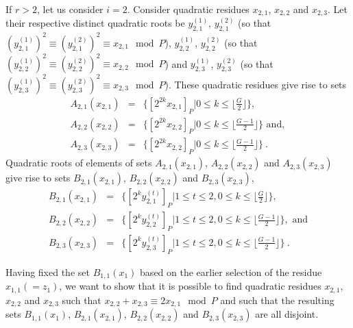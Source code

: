 \documentclass[12pt]{article} \pagestyle{plain} \topmargin
\begin{document}
If $r>2$, let us consider $i=2$. Consider quadratic residues
$x_{2,1}$, $x_{2,2}$ and $x_{2,3}$. Let  their respective distinct
quadratic roots be $y_{2,1}^{(1)}$, $y_{2,1}^{(2)}$ (so that
$(y_{2,1}^{(1)})^2 \equiv (y_{2,1}^{(2)})^2 \equiv x_{2,1} \mod P$),
$y_{2,2}^{(1)}$, $y_{2,2}^{(2)}$ (so that $(y_{2,2}^{(1)})^2 \equiv
(y_{2,2}^{(2)})^2 \equiv x_{2,2} \mod P$) and $y_{2,3}^{(1)}$,
$y_{2,3}^{(2)}$ (so that $(y_{2,3}^{(1)})^2 \equiv (y_{2,3}^{(2)})^2
\equiv x_{2,3} \mod P$). These quadratic residues give rise to sets
\begin{eqnarray}
A_{2,1}(x_{2,1})&=&\{ [2^{2k}x_{2,1}]_P | 0 \leq k \leq \lfloor
\frac{G}{2} \rfloor\},\\ A_{2,2}(x_{2,2})&=& \{ [2^{2k}x_{2,2}]_P
| 0
\leq k \leq \lfloor \frac{G-1}{2} \rfloor\} \text{ and},\\
A_{2,3}(x_{2,3})&=& \{ [2^{2k}x_{2,2}]_P | 0 \leq k \leq \lfloor
\frac{G-1}{2} \rfloor\}~.
\end{eqnarray}
Quadratic roots of elements of sets $A_{2,1}(x_{2,1})$,
$A_{2,2}(x_{2,2})$ and $A_{2,3}(x_{2,3})$ give rise to sets
$B_{2,1}(x_{2,1})$, $B_{2,2}(x_{2,2})$ and $B_{2,3}(x_{2,3})$,
\begin{eqnarray}
B_{2,1}(x_{2,1})&=&\{[2^ky_{2,1}^{(t)}]_P | 1 \leq t \leq 2, 0
\leq k
\leq \lfloor \frac{G}{2}\rfloor\},\\
B_{2,2}(x_{2,2})&=&\{[2^ky_{2,2}^{(t)}]_P | 1 \leq t \leq 2, 0
\leq k
\leq \lfloor \frac{G-1}{2}\rfloor\}, \text{ and}\\
B_{2,3}(x_{2,3})&=&\{[2^ky_{2,3}^{(t)}]_P | 1 \leq t \leq 2, 0
\leq k \leq \lfloor \frac{G-1}{2}\rfloor\}~.
\end{eqnarray}


Having fixed the set $B_{1,1}(x_1)$ based on the earlier selection
of the residue $x_{1,1} (=z_1)$, we want to show that it is
possible to find quadratic residues $x_{2,1}$, $x_{2,2}$ and
$x_{2,3}$ such that $x_{2,2} + x_{2,3} \equiv 2x_{2,1} \mod P$ and
such that the resulting sets $B_{1,1}(x_1)$, $B_{2,1}(x_{2,1})$,
$B_{2,2}(x_{2,2})$ and $B_{2,3}(x_{2,3})$ are all disjoint.
\end{document}
